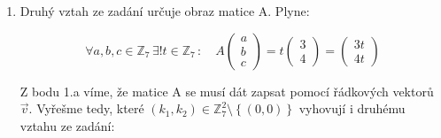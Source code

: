 \documentclass[12pt]{article}
\begin{document}
\begin{enumerate}
\begin{enumerate}
    Označme si tedy řádkový vektor $\vec{v} = \left(\begin{array}{ccc} 2 & 5 & 1 \end{array}\right)$

    Určeme si první omezující podmínku pro matici A:

    \[
      A \in \left\{
        \left(\begin{array}{c} k_1 \cdot \vec{v} \\ \hline k_2 \cdot \vec{v} \end{array}\right)
        \quad \middle| \quad (k_1, k_2) \in \mathbb{Z}_7^2 \setminus \left\{\left(0,0\right)\right\}
      \right\}
    \]


    \item
    Druhý vztah ze zadání určuje obraz matice A. Plyne:

    \[
      \forall a,b,c \in \mathbb{Z}_7 \,\exists ! t \in \mathbb{Z}_7 \,: \quad A \left( \begin{array}{c}
        a \\ b \\ c
      \end{array} \right) = t \left( \begin{array}{c}
        3 \\ 4
      \end{array} \right) = \left( \begin{array}{c}
        3t \\ 4t
      \end{array} \right)
    \]

    Z bodu 1.a víme, že matice A se musí dát zapsat pomocí řádkových vektorů $\vec{v}$.
    Vyřešme tedy, které $(k_1, k_2) \in \mathbb{Z}_7^2 \setminus \left\{\left(0,0\right)\right\}$
    vyhovují i druhému vztahu ze zadání:



\end{enumerate}
\end{enumerate}
\end{document}
